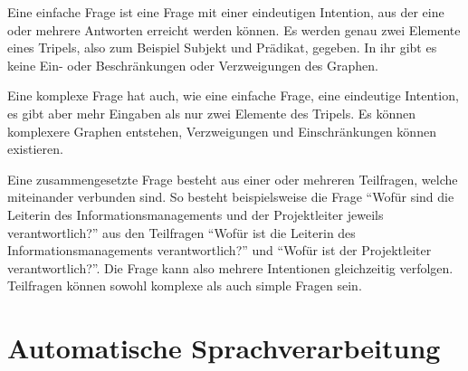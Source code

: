\begin{definition}\label{def:efrage}
Eine einfache Frage ist eine Frage mit einer eindeutigen Intention, aus der eine oder mehrere Antworten erreicht werden können.
Es werden genau zwei Elemente eines Tripels, also zum Beispiel Subjekt und Prädikat, gegeben.
In ihr gibt es keine Ein- oder Beschränkungen oder Verzweigungen des Graphen.
\end{definition}

\begin{definition}\label{def:kfrage}
Eine komplexe Frage hat auch, wie eine einfache Frage, eine eindeutige Intention, es gibt aber mehr Eingaben als nur zwei Elemente des Tripels.
Es können komplexere Graphen entstehen, Verzweigungen und Einschränkungen können existieren.
\end{definition}

\begin{definition}\label{def:zfrage}
Eine zusammengesetzte Frage besteht aus einer oder mehreren Teilfragen, welche miteinander verbunden sind.
So besteht beispielsweise die Frage \enquote{Wofür sind die Leiterin des Informationsmanagements und der Projektleiter jeweils verantwortlich?} aus den Teilfragen
\enquote{Wofür ist die Leiterin des Informationsmanagements verantwortlich?} und \enquote{Wofür ist der Projektleiter verantwortlich?}.
Die Frage kann also mehrere Intentionen gleichzeitig verfolgen.
Teilfragen können sowohl komplexe als auch simple Fragen sein.
\end{definition}

\section{Automatische Sprachverarbeitung}

